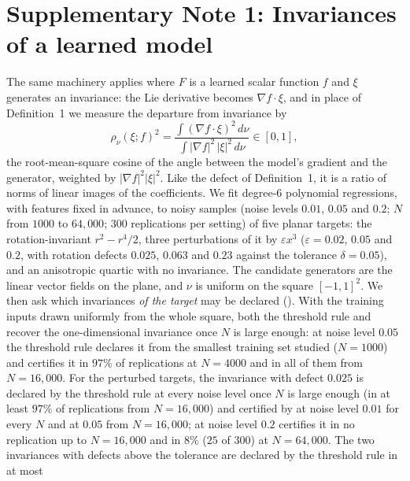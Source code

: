 
\section*{Supplementary Note 1: Invariances of a learned model}
\label{sn:invariance}

The same machinery applies where $F$ is a learned scalar function $f$ and $\xi$
generates an invariance: the Lie derivative becomes $\nabla f \cdot \xi$, and
in place of Definition~1 we measure the departure from invariance by
\[
\rho_\nu(\xi; f)^2 = \frac{\int (\nabla f\cdot\xi)^2\,d\nu}{\int
|\nabla f|^2\,|\xi|^2\,d\nu} \in [0,1],
\]
the root-mean-square cosine of the angle between the model's gradient and the
generator, weighted by $|\nabla f|^2|\xi|^2$. Like the defect of Definition~1,
it is a ratio of norms of linear images of the coefficients. We fit degree-$6$
polynomial regressions, with features fixed in advance, to noisy samples (noise
levels $0.01$, $0.05$ and $0.2$; $N$ from $1000$ to $64{,}000$; $300$
replications per setting) of five planar targets: the rotation-invariant
$r^2 - r^4/2$, three perturbations of it by $\varepsilon x^3$ ($\varepsilon =
0.02$, $0.05$ and $0.2$, with rotation defects $0.025$, $0.063$ and $0.23$
against the tolerance $\delta = 0.05$), and an anisotropic quartic with no
invariance. The candidate generators are the linear vector fields on the plane,
and $\nu$ is uniform on the square $[-1,1]^2$. We then ask which invariances
\emph{of the target} may be declared (\SFinvariance). With the training inputs
drawn uniformly from the whole square, both the threshold rule and \symcert{}
recover the one-dimensional invariance once $N$ is large enough: at noise level
$0.05$ the threshold rule declares it from the smallest training set studied
($N = 1000$) and \symcert{} certifies it in $97\%$ of replications at
$N = 4000$ and in all of them from $N = 16{,}000$. For the perturbed targets,
the invariance with defect $0.025$ is declared by the threshold rule at every
noise level once $N$ is large enough (in at least $97\%$ of replications from
$N = 16{,}000$) and certified by \symcert{} at noise level $0.01$ for every $N$
and at $0.05$ from $N = 16{,}000$; at noise level $0.2$ \symcert{} certifies it
in no replication up to $N = 16{,}000$ and in $8\%$ ($25$ of $300$) at
$N = 64{,}000$. The two invariances with
defects above the tolerance are declared by the threshold rule in at most
